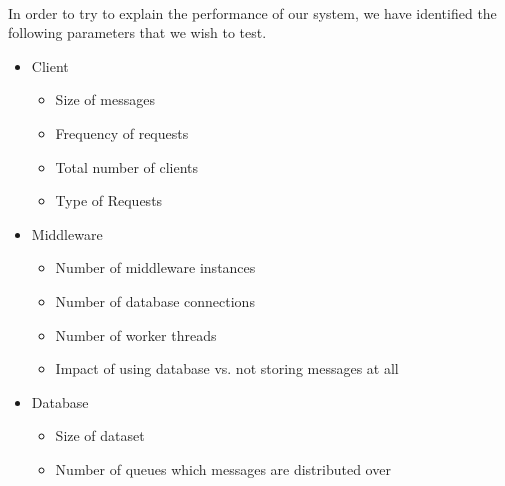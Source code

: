 \documentclass{article}
\begin{document}
        \\
        In order to try to explain the performance of our system, we have identified the following parameters that we wish to test.
        \begin{itemize}
            \item Client
            \begin{itemize}
                \item Size of messages
                \item Frequency of requests
                \item Total number of clients
                \item Type of Requests
            \end{itemize}
            \item Middleware
            \begin{itemize}
                \item Number of middleware instances
                \item Number of database connections
                \item Number of worker threads
                \item Impact of using database vs. not storing messages at all
            \end{itemize}
            \item Database
            \begin{itemize}
                \item Size of dataset
                \item Number of queues which messages are distributed over
            \end{itemize}
        \end{itemize}
\end{document}

